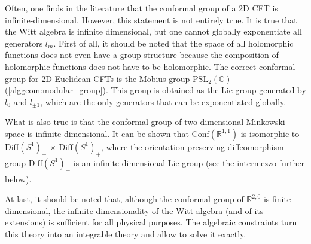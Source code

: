 
    \begin{remark}
        Often, one finds in the literature that the conformal group of a 2D CFT is infinite-dimensional. However, this statement is not entirely true. It is true that the Witt algebra is infinite dimensional, but one cannot globally exponentiate all generators $l_m$. First of all, it should be noted that the space of all holomorphic functions does not even have a group structure because the composition of holomorphic functions does not have to be holomorphic. The correct conformal group for 2D Euclidean CFTs is the M\"obius group $\mathrm{PSL}_2(\mathbb{C})$ (\cref{alggeom:modular_group}). This group is obtained as the Lie group generated by $l_0$ and $l_{\pm1}$, which are the only generators that can be exponentiated globally.

        What is also true is that the conformal group of two-dimensional Minkowski space is infinite dimensional. It can be shown that $\mathrm{Conf}(\mathbb{R}^{1,1})$ is isomorphic to $\mathrm{Diff}(S^1)_+\,\times\,\mathrm{Diff}(S^1)_+$, where the orientation-preserving diffeomorphism group $\mathrm{Diff}(S^1)_+$ is an infinite-dimensional Lie group (see the intermezzo further below).

        At last, it should be noted that, although the conformal group of $\mathbb{R}^{2,0}$ is finite dimensional, the infinite-dimensionality of the Witt algebra (and of its extensions) is sufficient for all physical purposes. The algebraic constraints turn this theory into an integrable theory and allow to solve it exactly.
    \end{remark}

